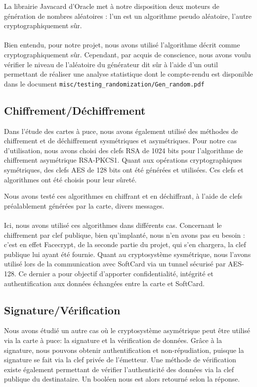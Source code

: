 \documentclass[a4paper,11pt,french]{article}
\begin{document}
La librairie Javacard d'Oracle met à notre disposition deux moteurs de génération
de nombres aléatoires : l'un est un algorithme pseudo aléatoire, l'autre 
cryptographiquement sûr.

\paragraph{}
Bien entendu, pour notre projet, nous avons utilisé l'algorithme décrit comme 
\og{}cryptographiquement sûr\fg{}. Cependant, par acquis de conscience, nous avons voulu
vérifier le niveau de l'aléatoire du générateur dit sûr à l'aide d'un
outil permettant de réaliser une analyse statistique dont le compte-rendu
est disponible dans le document 
\texttt{misc/testing\_randomization/Gen\_random.pdf}

\subsection{Chiffrement/Déchiffrement}
Dans l'étude des cartes à puce, nous avons également utilisé des méthodes de 
chiffrement et de déchiffrement sysmétriques et asymétriques. Pour notre cas 
d'utilisation, nous avons choisi des clefs RSA de 1024 bits pour l'algorithme de
chiffrement asymétrique RSA-PKCS1. Quant aux opérations cryptographiques 
symétriques, des clefs AES de 128 bits ont été générées et utilisées. Ces clefs
et algorithmes ont été choisis pour leur sûreté.

Nous avons testé ces algorithmes en chiffrant et en déchiffrant, à l'aide de 
clefs préalablement générées par la carte, divers messages. 

\paragraph{}
Ici, nous avons utilisé ces algorithmes dans différents cas. Concernant
le chiffrement par clef publique, bien qu'implanté, nous n'en avons pas eu 
besoin : c'est en effet Facecrypt, de la seconde partie du projet, qui s'en 
chargera, la clef publique lui ayant été fournie. Quant au cryptosystème 
sysmétrique, nous l'avons utilisé lors de la communication avec SoftCard
via un \og{}tunnel \fg{} sécurisé par AES-128. Ce dernier a pour objectif d'apporter 
confidentialité, intégrité et authentification aux données échangées entre la 
carte et SoftCard.

\subsection{Signature/Vérification}
Nous avons étudié un autre cas où le cryptosystème asymétrique peut être utilisé
via la carte à puce: la signature et la vérification de données. Grâce à la 
signature, nous pouvons obtenir authentification et non-répudiation, puisque la
signature se fait via la clef privée de l'émetteur. Une méthode de vérification
existe également permettant de vérifier l'authenticité des données via la clef 
publique du destinataire. Un booléen nous est alors retourné selon la réponse.
\end{document}
